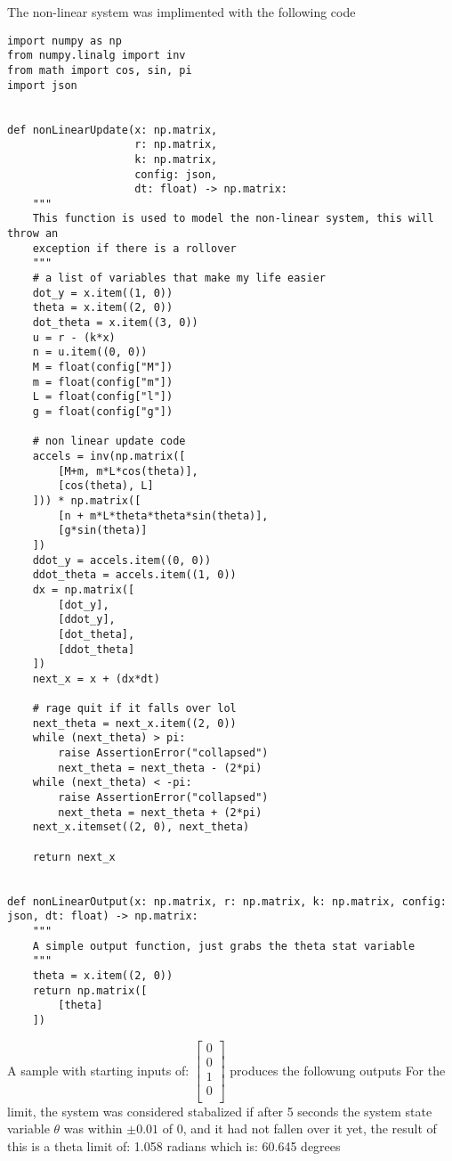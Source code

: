 The non-linear system was implimented with the following code
\begin{verbatim}
import numpy as np
from numpy.linalg import inv
from math import cos, sin, pi
import json


def nonLinearUpdate(x: np.matrix,
                    r: np.matrix,
                    k: np.matrix,
                    config: json,
                    dt: float) -> np.matrix:
    """
    This function is used to model the non-linear system, this will throw an
    exception if there is a rollover
    """
    # a list of variables that make my life easier
    dot_y = x.item((1, 0))
    theta = x.item((2, 0))
    dot_theta = x.item((3, 0))
    u = r - (k*x)
    n = u.item((0, 0))
    M = float(config["M"])
    m = float(config["m"])
    L = float(config["l"])
    g = float(config["g"])

    # non linear update code
    accels = inv(np.matrix([
        [M+m, m*L*cos(theta)],
        [cos(theta), L]
    ])) * np.matrix([
        [n + m*L*theta*theta*sin(theta)],
        [g*sin(theta)]
    ])
    ddot_y = accels.item((0, 0))
    ddot_theta = accels.item((1, 0))
    dx = np.matrix([
        [dot_y],
        [ddot_y],
        [dot_theta],
        [ddot_theta]
    ])
    next_x = x + (dx*dt)

    # rage quit if it falls over lol
    next_theta = next_x.item((2, 0))
    while (next_theta) > pi:
        raise AssertionError("collapsed")
        next_theta = next_theta - (2*pi)
    while (next_theta) < -pi:
        raise AssertionError("collapsed")
        next_theta = next_theta + (2*pi)
    next_x.itemset((2, 0), next_theta)

    return next_x


def nonLinearOutput(x: np.matrix, r: np.matrix, k: np.matrix, config: json, dt: float) -> np.matrix:
    """
    A simple output function, just grabs the theta stat variable
    """
    theta = x.item((2, 0))
    return np.matrix([
        [theta]
    ])
\end{verbatim}
A sample with starting inputs of: $\begin{bmatrix}
0\\
0\\
1\\
0\\
\end{bmatrix}
$ produces the followung outputs
For the limit, the system was considered stabalized if after 5 seconds the system state variable $\theta$ was within $\pm0.01$ of 0, and it had not fallen over it yet, the result of this is a theta limit of: 1.058 radians which is: 60.645 degrees
